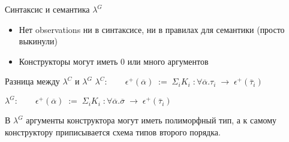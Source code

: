 \documentclass[10pt, mathserif]{beamer}
\theoremstyle{definition}
\begin{document}
\begin{frame}[fragile]{Синтаксис и семантика $\lambda^G$}
\begin{itemize}
 \item Нет observations ни в синтаксисе, ни в правилах для семантики (просто выкинули)
 \item Конструкторы могут иметь 0 или много аргументов
\end{itemize}
\end{frame}


\begin{frame}[fragile]{Разница между $\lambda^C$ и $\lambda^G$}
$\lambda^C:\qquad\epsilon^+(\overline{\alpha})\;:=\; \Sigma_i K_i \;:\forall\overline{\alpha}.\tau_i \;\to\;\epsilon^+(\bar{\tau}_i)$

$\lambda^G:\qquad\epsilon^+(\overline{\alpha})\;:=\; \Sigma_i K_i \;:\forall\overline{\alpha}.\overline{\sigma} \;\to\;\epsilon^+(\bar{\tau}_i)$

\vspace{1cm}
В $\lambda^G$ аргументы конструктора могут иметь полиморфный тип, а к самому конструктору
приписывается схема типов второго порядка.

% 
\end{frame}
\end{document}
